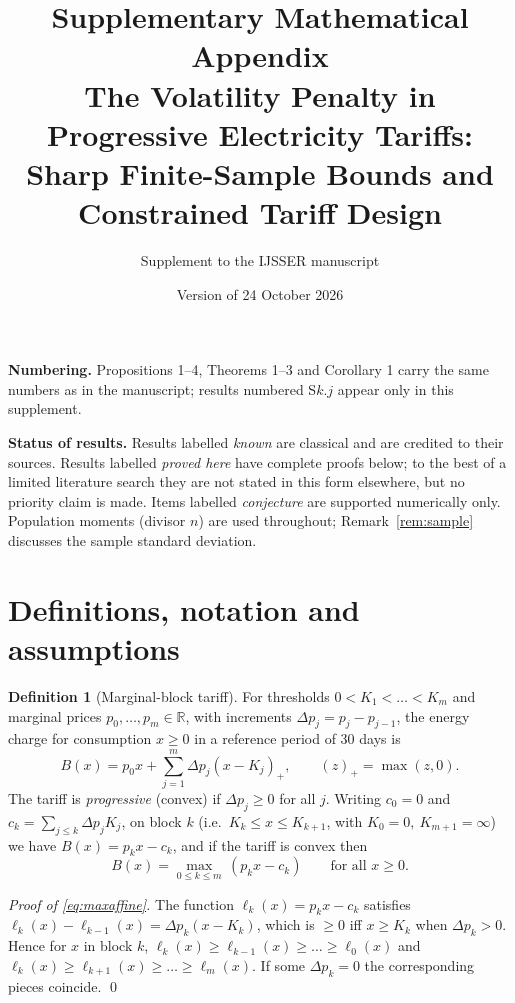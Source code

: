 \documentclass[11pt,a4paper]{article}
\title{Supplementary Mathematical Appendix\\[4pt]
\large The Volatility Penalty in Progressive Electricity Tariffs:\\ Sharp Finite-Sample Bounds and Constrained Tariff Design}
\author{Supplement to the IJSSER manuscript}
\date{Version of 24 October 2026}
\theoremstyle{definition}
\newtheorem{definition}{Definition}
\theoremstyle{plain}\newtheorem{sprop}{Proposition}[section]\newtheorem{slemma}[sprop]{Lemma}\newtheorem{scor}[sprop]{Corollary}
\theoremstyle{definition}
\theoremstyle{remark}
\newcommand{\pos}[1]{\left(#1\right)_{+}}
\numberwithin{equation}{section}
\begin{document}
\maketitle

\noindent\textbf{Numbering.} Propositions 1--4, Theorems 1--3 and Corollary 1 carry the same numbers as in the manuscript; results numbered S$k$.$j$ appear only in this supplement.\par\medskip\noindent\textbf{Status of results.} Results labelled \emph{known} are classical and are credited to their sources. Results labelled \emph{proved here} have complete proofs below; to the best of a limited literature search they are not stated in this form elsewhere, but no priority claim is made. Items labelled \emph{conjecture} are supported numerically only. Population moments (divisor $n$) are used throughout; Remark~\ref{rem:sample} discusses the sample standard deviation.

\tableofcontents

\section{Definitions, notation and assumptions}\label{sec:S1}

\begin{definition}[Marginal-block tariff]
For thresholds $0<K_1<\dots<K_m$ and marginal prices $p_0,\dots,p_m\in\mathbb R$, with increments $\Delta p_j=p_j-p_{j-1}$, the energy charge for consumption $x\ge0$ in a reference period of 30 days is
\begin{equation}\label{eq:tariff}
B(x)=p_0x+\sum_{j=1}^m\Delta p_j\pos{x-K_j},\qquad \pos{z}=\max(z,0).
\end{equation}
The tariff is \emph{progressive} (convex) if $\Delta p_j\ge0$ for all $j$. Writing $c_0=0$ and $c_k=\sum_{j\le k}\Delta p_jK_j$, on block $k$ (i.e.\ $K_k\le x\le K_{k+1}$, with $K_0=0,\ K_{m+1}=\infty$) we have $B(x)=p_kx-c_k$, and if the tariff is convex then
\begin{equation}\label{eq:maxaffine}
B(x)=\max_{0\le k\le m}\,(p_kx-c_k)\qquad\text{for all }x\ge0 .
\end{equation}
\end{definition}

\noindent\emph{Proof of \eqref{eq:maxaffine}.} The function $\ell_k(x)=p_kx-c_k$ satisfies $\ell_k(x)-\ell_{k-1}(x)=\Delta p_k(x-K_k)$, which is $\ge0$ iff $x\ge K_k$ when $\Delta p_k>0$. Hence for $x$ in block $k$, $\ell_k(x)\ge\ell_{k-1}(x)\ge\dots\ge\ell_0(x)$ and $\ell_k(x)\ge\ell_{k+1}(x)\ge\dots\ge\ell_m(x)$. If some $\Delta p_k=0$ the corresponding pieces coincide. \qed
\end{document}
